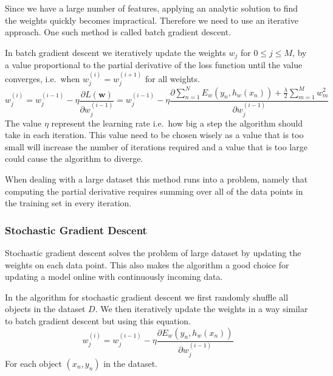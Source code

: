 Since we have a large number of features, applying an analytic solution to find the weights quickly becomes impractical.
Therefore we need to use an iterative approach.
One such method is called batch gradient descent.

In batch gradient descent we iteratively update the weights $w_j$ for $0 \leq j \leq M$, by a value proportional to the partial derivative of the loss function until the value converges, i.e.\ when $w_{j}^{(i)} = w_j^{(i+1)}$ for all weights.
\[ w_j^{(i)} = w_j^{(i-1)} - \eta \frac{\partial L(\mathbf{w})}{\partial w_j^{(i-1)}}
       = w_{j}^{(i-1)} - \eta \frac{\partial \sum_{n=1}^N E_w(y_n, h_w(x_n)) + \frac{\lambda}{2}\sum_{m=1}^M w_m^2}{\partial w_j^{(i-1)}} \]  
The value $\eta$ represent the learning rate i.e.\ how big a step the algorithm should take in each iteration.
This value need to be chosen wisely as a value that is too small will increase the number of iterations required and a value that is too large could cause the algorithm to diverge.

When dealing with a large dataset this method runs into a problem, namely that computing the partial derivative requires summing over all of the data points in the training set in every iteration. 

\subsubsection{Stochastic Gradient Descent}\label{sec:stochastic}

Stochastic gradient descent solves the problem of large dataset by updating the weights on each data point.
This also makes the algorithm a good choice for updating a model online with continuously incoming data. 

In the algorithm for stochastic gradient descent we first randomly shuffle all objects in the dataset $D$.
We then iteratively update the weights in a way similar to batch gradient descent but using this equation.
\[ w_j^{(i)} = w_j^{(i-1)} - \eta \frac{\partial E_w(y_n, h_w(x_n))}{\partial w_j^{(i-1)}} \]
For each object $(x_n, y_n)$ in the dataset.

